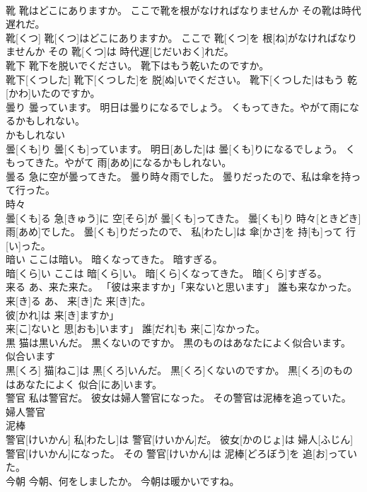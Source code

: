 \documentclass[8pt]{extreport}
\begin{document}
\begin{CJK}{UTF8}{min}
\\	靴 靴はどこにありますか。 ここで靴を根がなければなりませんか その靴は時代遅れだ。	
\\	靴[くつ] 靴[くつ]はどこにありますか。 ここで 靴[くつ]を 根[ね]がなければなりませんか その 靴[くつ]は 時代遅[じだいおく]れだ。
\\	靴下 靴下を脱いでください。 靴下はもう乾いたのですか。	
\\	靴下[くつした] 靴下[くつした]を 脱[ぬ]いでください。 靴下[くつした]はもう 乾[かわ]いたのですか。
\\	曇り 曇っています。 明日は曇りになるでしょう。 くもってきた。やがて雨になるかもしれない。	
\\	かもしれない 
\\	曇[くも]り 曇[くも]っています。 明日[あした]は 曇[くも]りになるでしょう。 くもってきた。やがて 雨[あめ]になるかもしれない。
\\	曇る 急に空が曇ってきた。 曇り時々雨でした。 曇りだったので、私は傘を持って行った。	
\\	時々
\\	曇[くも]る 急[きゅう]に 空[そら]が 曇[くも]ってきた。 曇[くも]り 時々[ときどき] 雨[あめ]でした。 曇[くも]りだったので、 私[わたし]は 傘[かさ]を 持[も]って 行[い]った。
\\	暗い ここは暗い。 暗くなってきた。 暗すぎる。	
\\	暗[くら]い ここは 暗[くら]い。 暗[くら]くなってきた。 暗[くら]すぎる。
\\	来る あ、来た来た。 「彼は来ますか」「来ないと思います」 誰も来なかった。	
\\	来[き]る あ、 来[き]た 来[き]た。 
\\	彼[かれ]は 来[き]ますか」
\\	来[こ]ないと 思[おも]います」 誰[だれ]も 来[こ]なかった。
\\	黒 猫は黒いんだ。 黒くないのですか。 黒のものはあなたによく似合います。	
\\	似合います 
\\	黒[くろ] 猫[ねこ]は 黒[くろ]いんだ。 黒[くろ]くないのですか。 黒[くろ]のものはあなたによく 似合[にあ]います。
\\	警官 私は警官だ。 彼女は婦人警官になった。 その警官は泥棒を追っていた。	
\\	婦人警官
\\	泥棒
\\	警官[けいかん] 私[わたし]は 警官[けいかん]だ。 彼女[かのじょ]は 婦人[ふじん] 警官[けいかん]になった。 その 警官[けいかん]は 泥棒[どろぼう]を 追[お]っていた。
\\	今朝 今朝、何をしましたか。 今朝は暖かいですね。	

\end{CJK}
\end{document}
